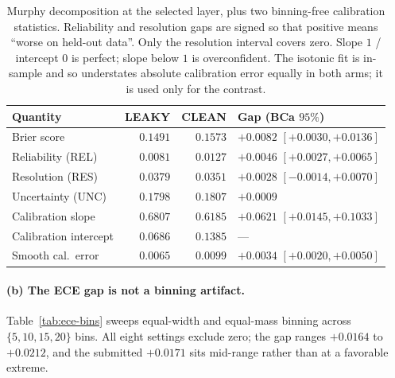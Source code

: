 \documentclass{article}
\begin{document}
\begin{table}[h]
\centering
\small
\begin{tabular}{@{}lrrl@{}}
\toprule
Quantity & LEAKY & CLEAN & Gap (BCa $95\%$) \\
\midrule
Brier score            & $0.1491$ & $0.1573$ & $+0.0082$ $[+0.0030,+0.0136]$ \\
\;\;Reliability (REL)  & $0.0081$ & $0.0127$ & $+0.0046$ $[+0.0027,+0.0065]$ \\
\;\;Resolution (RES)   & $0.0379$ & $0.0351$ & $+0.0028$ $[-0.0014,+0.0070]$ \\
\;\;Uncertainty (UNC)  & $0.1798$ & $0.1807$ & $+0.0009$ \\
\midrule
Calibration slope      & $0.6807$ & $0.6185$ & $+0.0621$ $[+0.0145,+0.1033]$ \\
Calibration intercept  & $0.0686$ & $0.1385$ & --- \\
Smooth cal.\ error     & $0.0065$ & $0.0099$ & $+0.0034$ $[+0.0020,+0.0050]$ \\
\bottomrule
\end{tabular}
\caption{Murphy decomposition at the selected layer, plus two binning-free
calibration statistics. Reliability and resolution gaps are signed so that
positive means ``worse on held-out data''. Only the resolution interval covers
zero. Slope $1$ / intercept $0$ is perfect; slope below $1$ is overconfident.
The isotonic fit is in-sample and so understates absolute calibration error
equally in both arms; it is used only for the contrast.}
\label{tab:murphy}
\end{table}

\paragraph{(b) The ECE gap is not a binning artifact.} Table~\ref{tab:ece-bins}
sweeps equal-width and equal-mass binning across $\{5,10,15,20\}$ bins. All
eight settings exclude zero; the gap ranges $+0.0164$ to $+0.0212$, and the
submitted $+0.0171$ sits mid-range rather than at a favorable extreme.
\end{document}

